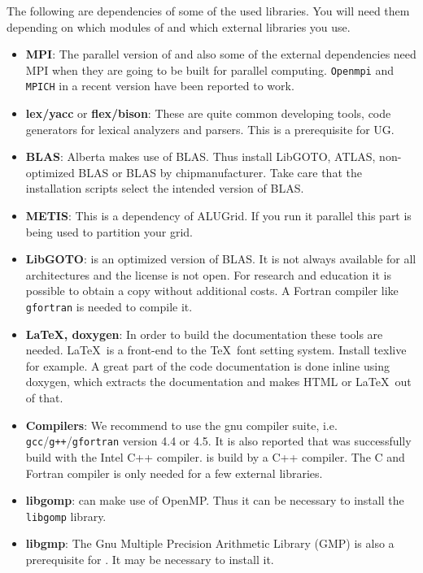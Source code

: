 The following are dependencies of some of the used libraries. You will need them depending on which modules of \Dune and which external libraries you use.
\begin{itemize}
\item \textbf{MPI}: The parallel version of \Dune and also some of the external dependencies need MPI when they are going to be built for parallel computing. \texttt{Openmpi} and \texttt{MPICH} in a recent version have been reported to work. 

\item \textbf{lex/yacc} or \textbf{flex/bison}: These are quite common developing tools, code generators for lexical analyzers and parsers. This is a prerequisite for UG.

\item \textbf{BLAS}: Alberta makes use of BLAS. Thus install LibGOTO, ATLAS, non-optimized BLAS or BLAS by chipmanufacturer. Take care that the installation scripts select the intended version of BLAS. 

\item \textbf{METIS}: This is a dependency of ALUGrid. If you run it parallel this part is being used to partition your grid.

\item \textbf{LibGOTO}: is an optimized version of BLAS. It is not always available for all architectures and 
the license is not open. For research and education it is possible to obtain a copy without additional costs.
A Fortran compiler like \texttt{gfortran} is needed to compile it.

\item \textbf{\LaTeX, doxygen}: In order to build the \Dumux documentation these tools are needed.  
\LaTeX\ is a front-end to the \TeX\ font setting system. Install texlive for example. A great part of the code documentation is done inline using doxygen, which extracts the documentation and makes HTML or \LaTeX\ out of that.

\item \textbf{Compilers}: We recommend to use the gnu compiler suite, i.e. \texttt{gcc}/\texttt{g++}/\texttt{gfortran} version 4.4 or 4.5.
It is also reported that \Dune was successfully build with the Intel C++ compiler. 
\Dune is build by a C++ compiler. The C and Fortran compiler is only needed for a few external libraries.

\item \textbf{libgomp}: \Dune can make use of OpenMP. Thus it can be necessary to install the \texttt{libgomp} library.

\item \textbf{libgmp}: The Gnu Multiple Precision Arithmetic Library (GMP) is also a prerequisite for \Dune. It may be necessary to install it.
\end{itemize}

